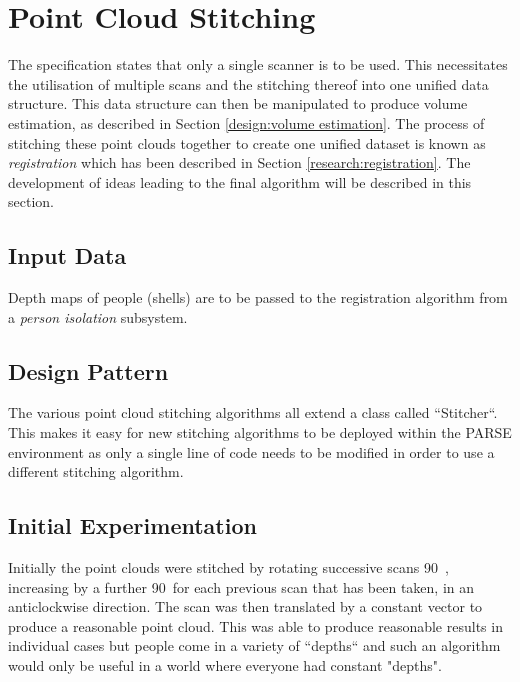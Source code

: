 \section{Point Cloud Stitching}
\label{design:registration}
\label{design:sitching} %
\label{design:stitching}
The specification states that only a single scanner is to be used. This necessitates the utilisation of multiple scans and the stitching thereof into one unified data structure. This data structure can then be manipulated to produce volume estimation, as described in Section \ref{design:volume estimation}. The process of stitching these point clouds together to create one unified dataset is known as \emph{registration}\cite{Makadia2006} which has been described in Section \ref{research:registration}. The development of ideas leading to the final algorithm will be described in this section.  \\

\subsection{Input Data}
Depth maps of people (shells) are to be passed to the registration algorithm from a \emph{person isolation} subsystem. 

\subsection{Design Pattern}
\label{design:design pattern}
The various point cloud stitching algorithms all extend a class called ``Stitcher``. This makes it easy for new stitching algorithms to be deployed within the PARSE environment as only a single line of code needs to be modified in order to use a different stitching algorithm.\\

\subsection{Initial Experimentation}
Initially the point clouds were stitched by rotating successive scans 90\degree \ , increasing by a further 90\degree \ for each previous scan that has been taken, in an anticlockwise direction. The scan was then translated by a constant vector to produce a reasonable point cloud. This was able to produce reasonable results in individual cases but people come in a variety of ``depths`` and such an algorithm would only be useful in a world where everyone had constant "depths". \\

